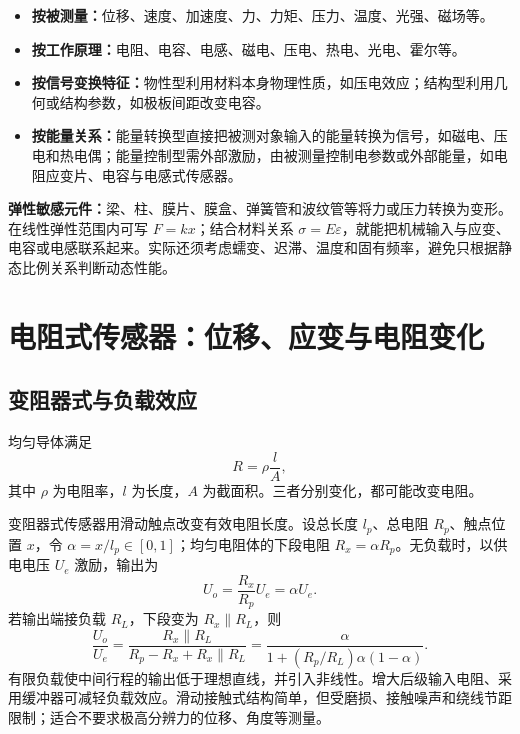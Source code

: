 \begin{itemize}
\item \textbf{按被测量：}位移、速度、加速度、力、力矩、压力、温度、光强、磁场等。
\item \textbf{按工作原理：}电阻、电容、电感、磁电、压电、热电、光电、霍尔等。
\item \textbf{按信号变换特征：}物性型利用材料本身物理性质，如压电效应；结构型利用几何或结构参数，如极板间距改变电容。
\item \textbf{按能量关系：}能量转换型直接把被测对象输入的能量转换为信号，如磁电、压电和热电偶；能量控制型需外部激励，由被测量控制电参数或外部能量，如电阻应变片、电容与电感式传感器。
\end{itemize}


\textbf{弹性敏感元件：}梁、柱、膜片、膜盒、弹簧管和波纹管等将力或压力转换为变形。在线性弹性范围内可写 $F=kx$；结合材料关系 $\sigma=E\varepsilon$，就能把机械输入与应变、电容或电感联系起来。实际还须考虑蠕变、迟滞、温度和固有频率，避免只根据静态比例关系判断动态性能。

\Needspace{5cm}
\section{电阻式传感器：位移、应变与电阻变化}
\label{sec:ch4-resistance}
\noindent{}

\subsection{变阻器式与负载效应}
均匀导体满足
\[
R=\rho\frac{l}{A},
\]
其中 $\rho$ 为电阻率，$l$ 为长度，$A$ 为截面积。三者分别变化，都可能改变电阻。

变阻器式传感器用滑动触点改变有效电阻长度。设总长度 $l_p$、总电阻 $R_p$、触点位置 $x$，令 $\alpha=x/l_p\in[0,1]$；均匀电阻体的下段电阻 $R_x=\alpha R_p$。无负载时，以供电电压 $U_e$ 激励，输出为
\[
U_o=\frac{R_x}{R_p}U_e=\alpha U_e.
\]
若输出端接负载 $R_L$，下段变为 $R_x\parallel R_L$，则
\[
\boxed{\frac{U_o}{U_e}
=\frac{R_x\parallel R_L}{R_p-R_x+R_x\parallel R_L}
=\frac{\alpha}{1+(R_p/R_L)\alpha(1-\alpha)}}.
\]
有限负载使中间行程的输出低于理想直线，并引入非线性。增大后级输入电阻、采用缓冲器可减轻负载效应。滑动接触式结构简单，但受磨损、接触噪声和绕线节距限制；适合不要求极高分辨力的位移、角度等测量。


